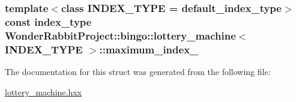 \hypertarget{structWonderRabbitProject_1_1bingo_1_1lottery__machine_a44860cbc8b1fe744522ffdfb9aa8c557}{
\subsubsection[{maximum\-\_\-index\-\_\-}]{\setlength{\rightskip}{0pt plus 5cm}template$<$class I\-N\-D\-E\-X\-\_\-\-T\-Y\-P\-E  = default\-\_\-index\-\_\-type$>$ const index\-\_\-type {\bf Wonder\-Rabbit\-Project\-::bingo\-::lottery\-\_\-machine}$<$ I\-N\-D\-E\-X\-\_\-\-T\-Y\-P\-E $>$\-::maximum\-\_\-index\-\_\-\hspace{0.3cm}{\ttfamily [private]}}}\label{structWonderRabbitProject_1_1bingo_1_1lottery__machine_a44860cbc8b1fe744522ffdfb9aa8c557}


The documentation for this struct was generated from the following file\-:\begin{DoxyCompactItemize}
\item 
\hyperlink{lottery__machine_8hxx}{lottery\-\_\-machine.\-hxx}\end{DoxyCompactItemize}
